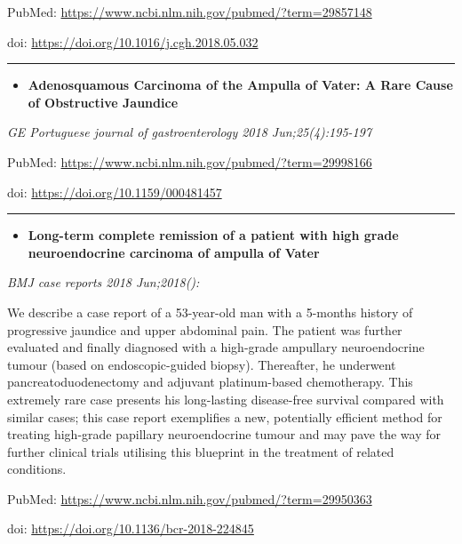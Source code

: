\documentclass[]{article}
\providecommand{\tightlist}{%
  \setlength{\itemsep}{0pt}\setlength{\parskip}{0pt}}
\begin{document}
PubMed: \url{https://www.ncbi.nlm.nih.gov/pubmed/?term=29857148}

doi: \url{https://doi.org/10.1016/j.cgh.2018.05.032}

{}

{}

\begin{center}\rule{0.5\linewidth}{\linethickness}\end{center}

\begin{itemize}
\tightlist
\item
  \textbf{Adenosquamous Carcinoma of the Ampulla of Vater: A Rare Cause
  of Obstructive Jaundice}
\end{itemize}

\emph{GE Portuguese journal of gastroenterology 2018 Jun;25(4):195-197}

PubMed: \url{https://www.ncbi.nlm.nih.gov/pubmed/?term=29998166}

doi: \url{https://doi.org/10.1159/000481457}

{}

{}

\begin{center}\rule{0.5\linewidth}{\linethickness}\end{center}

\begin{itemize}
\tightlist
\item
  \textbf{Long-term complete remission of a patient with high grade
  neuroendocrine carcinoma of ampulla of Vater}
\end{itemize}

\emph{BMJ case reports 2018 Jun;2018():}

We describe a case report of a 53-year-old man with a 5-months history
of progressive jaundice and upper abdominal pain. The patient was
further evaluated and finally diagnosed with a high-grade ampullary
neuroendocrine tumour (based on endoscopic-guided biopsy). Thereafter,
he underwent pancreatoduodenectomy and adjuvant platinum-based
chemotherapy. This extremely rare case presents his long-lasting
disease-free survival compared with similar cases; this case report
exemplifies a new, potentially efficient method for treating high-grade
papillary neuroendocrine tumour and may pave the way for further
clinical trials utilising this blueprint in the treatment of related
conditions.

PubMed: \url{https://www.ncbi.nlm.nih.gov/pubmed/?term=29950363}

doi: \url{https://doi.org/10.1136/bcr-2018-224845}
\end{document}

